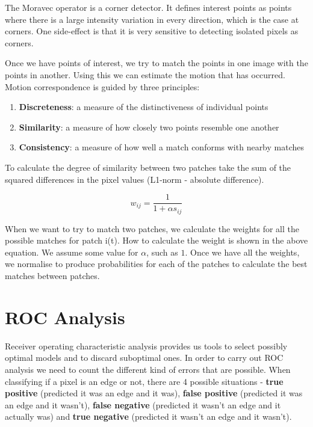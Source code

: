 \documentclass{article}
\begin{document}
	\par 
	The Moravec operator is a corner detector. It defines interest points as points where there is a large intensity variation in every direction, which is the case at corners. One side-effect is that it is very sensitive to detecting isolated pixels as corners.
	
	\par 
	Once we have points of interest, we try to match the points in one image with the points in another. Using this we can estimate the motion that has occurred. Motion correspondence is guided by three principles:
	\begin{enumerate}
		\item \textbf{Discreteness}: a measure of the distinctiveness of individual points
		\item \textbf{Similarity}: a measure of how closely two points resemble one another
		\item \textbf{Consistency}: a measure of how well a match conforms with nearby matches
	\end{enumerate}
	
	To calculate the degree of similarity between two patches take the sum of the squared differences in the pixel values (L1-norm - absolute difference).
	
	\[ w_{ij} = \frac{1}{1 + \alpha s_{ij}} \]
	
	When we want to try to match two patches, we calculate the weights for all the possible matches for patch i(t). How to calculate the weight is shown in the above equation. We assume some value for $\alpha$, such as $1$. Once we have all the weights, we normalise to produce probabilities for each of the patches to calculate the best matches between patches.
	

	\section{ROC Analysis}
	Receiver operating characteristic analysis provides us tools to select possibly optimal models and to discard suboptimal ones. In order to carry out ROC analysis we need to count the different kind of errors that are possible. When classifying if a pixel is an edge or not, there are 4 possible situations - \textbf{true positive} (predicted it was an edge and it was), \textbf{false positive} (predicted it was an edge and it wasn't), \textbf{false negative} (predicted it wasn't an edge and it actually was) and \textbf{true negative} (predicted it wasn't an edge and it wasn't).
	
\end{document}
